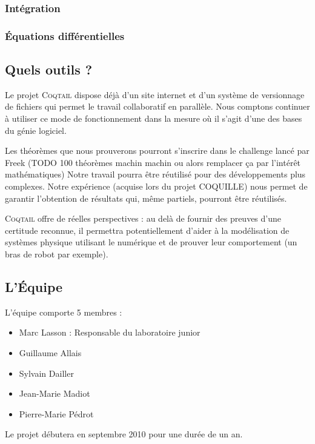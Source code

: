 \documentclass[11pt]{article}
\newcommand{\coqtail}{\textsc{Coqtail}}
\begin{document}
\subsubsection{Intégration}

\subsubsection{Équations différentielles}


\subsection{Quels outils ?}


Le projet \coqtail{} dispose déjà d'un site internet\cite{coqtail} et d'un système de versionnage de fichiers qui permet le travail collaboratif en parallèle. Nous comptons continuer à utiliser ce mode de fonctionnement dans la mesure où il s'agit d'une des bases du génie logiciel.


Les théorèmes que nous prouverons pourront s'inscrire dans le challenge lancé par Freek (TODO 100 théorèmes machin machin ou alors remplacer ça par l'intérêt mathématiques) Notre travail pourra être réutilisé pour des développements plus complexes. Notre expérience (acquise lors du projet COQUILLE) nous permet de garantir l'obtention de résultats qui, même partiels, pourront être réutilisés.


\coqtail{} offre de réelles perspectives : au delà de fournir des preuves d'une certitude reconnue, %
il permettra potentiellement d'aider à la modélisation de systèmes physique utilisant le numérique et de prouver leur comportement (un bras de robot par exemple). %

\subsection{L'Équipe}

L'équipe comporte 5 membres :

\begin{itemize}
 \item Marc Lasson : Responsable du laboratoire junior
 \item Guillaume Allais
 \item Sylvain Dailler
 \item Jean-Marie Madiot
 \item Pierre-Marie Pédrot
\end{itemize}

Le projet débutera en septembre 2010 pour une durée de un an.

\printbibliography
\end{document}
